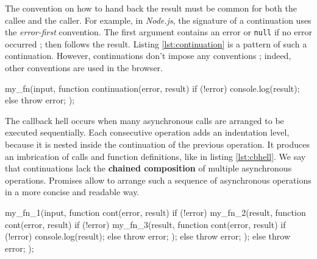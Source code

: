 The convention on how to hand back the result must be common for both the callee and the caller.
For example, in \textit{Node.js}, the signature of a continuation uses the \textit{error-first} convention.
The first argument contains an error or \texttt{null} if no error occurred ; then follows the result.
Listing \ref{lst:continuation} is a pattern of such a continuation.
However, continuations don't impose any conventions ; indeed, other conventions are used in the browser.

\begin{code}[js, %
             caption={Example of a continuation}, %
             label={lst:continuation}] %
my_fn(input, function continuation(error, result) {
  if (!error) {
    console.log(result);
  } else {
    throw error;
  }
});
\end{code}

The callback hell occurs when many asynchronous calls are arranged to be executed sequentially.
Each consecutive operation adds an indentation level, because it is nested inside the continuation of the previous operation.
It produces an imbrication of calls and function definitions, like in listing \ref{lst:cbhell}.
We say that continuations lack the \textbf{chained composition} of multiple asynchronous operations.
Promises allow to arrange such a sequence of asynchronous operations in a more concise and readable way.


\begin{code}[js, %
             caption={Example of a sequence of continuations}, %
             label={lst:cbhell}] %
my_fn_1(input, function cont(error, result) {
  if (!error) {
    my_fn_2(result, function cont(error, result) {
      if (!error) {
        my_fn_3(result, function cont(error, result) {
          if (!error) {
            console.log(result);
          } else {
            throw error;
          }
        });
      } else {
        throw error;
      }
    });
  } else {
    throw error;
  }
});
\end{code}

